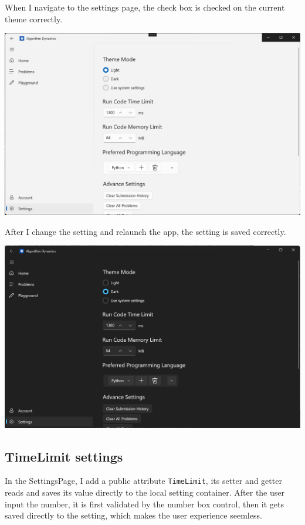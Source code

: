 \documentclass[a4paper]{report}
\newcommand{\code}{\texttt}
\begin{document}
When I navigate to the settings page, the check box is checked on the current theme correctly.

\includegraphics[width=\textwidth, height=\textheight, keepaspectratio]{SettingsPage-InitTheme}

After I change the setting and relaunch the app, the setting is saved correctly.

\includegraphics[width=\textwidth, height=\textheight, keepaspectratio]{SettingsPage-SaveTheme}

\subsection{TimeLimit settings}

In the SettingsPage, I add a public attribute \code{TimeLimit}, its setter and getter reads and saves its value directly to the local setting container. After the user input the number, it is first validated by the number box control, then it gets saved directly to the setting, which makes the user experience seemless.
\end{document}
